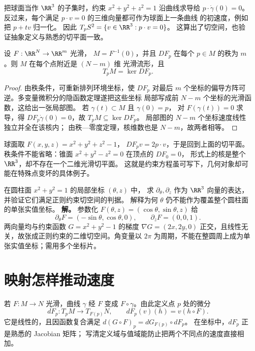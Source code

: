 把球面当作 \(\RR^3\) 的子集时，约束
\(x^2+y^2+z^2=1\) 沿曲线求导给
\(p\cdot\dot\gamma(0)=0\)。
反过来，每个满足 \(p\cdot v=0\) 的三维向量都可作为球面上一条曲线
的初速度，例如把 \(p+tv\) 归一化。
因此 \(T_pS^2=\{v\in\RR^3:p\cdot v=0\}\)。
这算出了切空间，也验证抽象定义与熟悉的切平面一致。

\begin{proposition}[正则约束的切空间]
设 \(F:\RR^N\to\RR^m\) 光滑，
\(M=F^{-1}(0)\)，并且 \(DF_p\) 在每个 \(p\in M\)
的秩为 \(m\)。则 \(M\) 在每个点附近是 \((N-m)\) 维
光滑流形，且
\[
T_pM=\ker DF_p.
\]
\end{proposition}
\begin{proof}
由秩条件，可重新排列环境坐标，使 \(DF_p\) 对最后 \(m\)
个坐标的偏导方阵可逆。多变量微积分的隐函数定理遂把这些坐标
局部写成前 \(N-m\) 个坐标的光滑函数，这给出一张局部图。
若 \(\gamma(t)\subset M\) 且 \(\gamma(0)=p\)，
对 \(F(\gamma(t))=0\) 求导，得
\(DF_p\dot\gamma(0)=0\)，故 \(T_pM\subseteq\ker DF_p\)。
局部图的 \(N-m\) 个坐标速度线性独立并全在该核内；
由秩—零度定理，核维数也是 \(N-m\)，故两者相等。
\end{proof}

球面取 \(F(x,y,z)=x^2+y^2+z^2-1\)，
\(DF_pv=2p\cdot v\)，于是回到上面的切平面。
秩条件不能省略：锥面
\(x^2+y^2-z^2=0\) 在顶点的 \(DF_0=0\)，
形式上的核是整个 \(\RR^3\)，却不存在一个二维光滑切平面。
这就是约束方程虽可写下，几何对象却可能在特殊点变坏的具体例子。


\par
\begin{workedexample}
在圆柱面 \(x^2+y^2=1\) 的局部坐标 \((\theta,z)\) 中，
求 \(\partial_\theta,\partial_z\) 作为 \(\RR^3\) 向量的表达，
并验证它们满足正则约束切空间的判据。
解释为何 \(\theta\) 仍不能作为覆盖整个圆柱面的单张实值坐标。
\textbf{解。} 参数化 \(F(\theta,z)=(\cos\theta,\sin\theta,z)\) 给
\[
\partial_\theta F=(-\sin\theta,\cos\theta,0),\qquad
\partial_zF=(0,0,1).
\]
两向量均与约束函数 \(G=x^2+y^2-1\) 的梯度 \(\nabla G=(2x,2y,0)\) 正交，且线性无关，故张成正则约束的二维切空间。角变量以 \(2\pi\) 为周期，不能在整圆周上成为单张实值坐标；需用多个坐标片。
\end{workedexample}
\par
\section{映射怎样推动速度}

若 \(F:M\to N\) 光滑，曲线 \(\gamma\) 经 \(F\) 变成
\(F\circ\gamma\)。由此定义点 \(p\) 处的微分
\[
dF_p:T_pM\to T_{F(p)}N,\qquad
dF_p(v)(h)=v(h\circ F).
\]
它是线性的，且因函数复合满足
\(d(G\circ F)_p=dG_{F(p)}\circ dF_p\)。
在坐标中，\(dF_p\) 正是熟悉的 Jacobian 矩阵；
写清定义域与值域能防止把两个不同点的速度直接相加。

